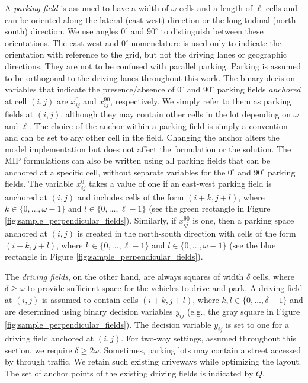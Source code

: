 \documentclass[10pt]{article}
\newcommand{\zeroparkvar}[2]{x^{0}_{#1#2}}
\newcommand{\ninetyparkvar}[2]{x^{90}_{#1#2}}
\newcommand{\drivevar}[2]{y_{#1#2}}
\newcommand{\existingdriveset}{Q}
\newcommand{\parkwidth}{\omega}
\newcommand{\parklength}{\ell}
\newcommand{\drivewidth}{\delta}
\theoremstyle{definition}
\begin{document}
A \textit{parking field} is assumed to have a width of $\parkwidth$ cells and a length of $\parklength$ cells and can be oriented along the lateral (east-west) direction or the longitudinal (north-south) direction. We use angles $0^{\circ}$ and $90^{\circ}$ to distinguish between these orientations. The east-west and $0^{\circ}$ nomenclature is used only to indicate the orientation with reference to the grid, but not the driving lanes or geographic directions. They are not to be confused with parallel parking. Parking is assumed to be orthogonal to the driving lanes throughout this work. The binary decision variables that indicate the presence/absence of $0^{\circ}$ and $90^{\circ}$ parking fields \textit{anchored} at cell $(i, j)$ are $\zeroparkvar{i}{j}$ and $\ninetyparkvar{i}{j}$, respectively. We simply refer to them as parking fields at $(i, j)$, although they may contain other cells in the lot depending on $\parkwidth$ and $\parklength$. The choice of the anchor within a parking field is simply a convention and can be set to any other cell in the field. Changing the anchor alters the model implementation but does not affect the formulation or the solution. The MIP formulations can also be written using all parking fields that can be anchored at a specific cell, without separate variables for the $0^{\circ}$ and $90^{\circ}$ parking fields. The variable $\zeroparkvar{i}{j}$ takes a value of one if an east-west parking field is anchored at $(i,j)$ and includes cells of the form $(i + k, j + l)$, where $k \in \{0, \ldots, \parkwidth-1 \}$ and $ l \in \{0, \ldots, \parklength-1\}$ (see the green rectangle in Figure \ref{fig:sample_perpendicular_fields}). Similarly, if $\ninetyparkvar{i}{j}$ is one, then a parking space anchored at $(i, j)$ is created in the north-south direction with cells of the form $(i + k, j + l)$, where $k \in \{0, \ldots, \parklength-1 \}$ and $l \in \{0, \ldots, \parkwidth-1\}$ (see the blue rectangle in Figure \ref{fig:sample_perpendicular_fields}). 

The \textit{driving fields}, on the other hand, are always squares of width $\drivewidth$ cells, where $\drivewidth \geq \parkwidth$ to provide sufficient space for the vehicles to drive and park. A driving field at $(i, j)$ is assumed to contain cells $(i + k, j + l)$, where $k, l \in \{0, \ldots, \drivewidth-1 \}$ and are determined using binary decision variables $y_{ij}$ (e.g., the gray square in Figure \ref{fig:sample_perpendicular_fields}). The decision variable $\drivevar{i}{j}$ is set to one for a driving field anchored at $(i, j)$. For two-way settings, assumed throughout this section, we require $ \drivewidth \geq 2\parkwidth$. Sometimes, parking lots may contain a street accessed by through traffic. We retain such existing driveways while optimizing the layout. The set of anchor points of the existing driving fields is indicated by $\existingdriveset$. 
\end{document}
